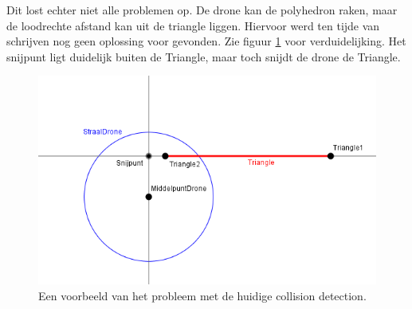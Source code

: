 \noindent
Dit lost echter niet alle problemen op. De drone kan de polyhedron raken, maar de loodrechte afstand kan uit de triangle liggen. Hiervoor werd ten tijde van schrijven nog geen oplossing voor gevonden. Zie figuur \ref{fig:CollisionDetectionProbleem} voor verduidelijking. Het snijpunt ligt duidelijk buiten de Triangle, maar toch snijdt de drone de Triangle.
\begin{figure}[h]
	\includegraphics[width=1\textwidth]{CollisionDetectionProbleem.png}
	\caption{Een voorbeeld van het probleem met de huidige collision detection.\\ }
	\label{fig:CollisionDetectionProbleem}
\end{figure}